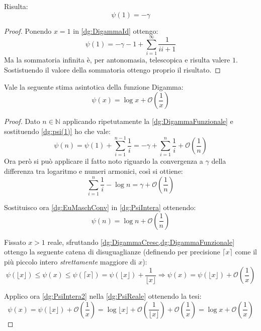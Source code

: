\begin{corollary}\label{dg:psi(1)}
	Risulta:
	\begin{equation*}
		\psi(1)=-\gamma
	\end{equation*}
\end{corollary}
\begin{proof}
	Ponendo $x=1$ in \cref{dg:DigammaId} ottengo:
	\begin{equation*}
		\psi(1)=-\gamma-1+\sum_{i=1}^{\infty}\frac 1{i{i+1}}
	\end{equation*}
	Ma la sommatoria infinita è, per antonomasia, telescopica e risulta valere $1$. Sostistuendo il valore della sommatoria
	ottengo proprio il risultato.
\end{proof}

\begin{theorem}\label{dg:psiApprox}
	Vale la seguente stima asintotica della funzione Digamma:
	\begin{equation*}
		\psi(x)=\log{x}+\mathcal{O}\left(\frac 1x\right)
	\end{equation*}
\end{theorem}
\begin{proof}
	Dato $n\in\mathbb{N}$ applicando ripetutamente la \cref{dg:DigammaFunzionale} e sostituendo \cref{dg:psi(1)}
	ho che vale:
	\begin{equation}\label{dg:PsiIntera}
		\psi(n)=\psi(1)+\sum_{i=1}^{n-1}\frac 1i = -\gamma+\sum_{i=1}^{n}\frac 1i + \mathcal{O}(\frac 1n)
	\end{equation}
	Ora però si può applicare il fatto noto riguardo la convergenza a $\gamma$ della differenza tra logaritmo e numeri armonici, 
	così si ottiene:
	\begin{equation}\label{dg:EuMaschConv}
		\sum_{i=1}^{n}\frac 1i - \log n = \gamma +\mathcal{O}\left(\frac 1n\right)
	\end{equation}
	
	Sostituisco ora \cref{dg:EuMaschConv} in \cref{dg:PsiIntera} ottenendo:
	\begin{equation}\label{dg:PsiIntera2}
		\psi(n)=\log n +\mathcal{O}\left(\frac 1n\right)
	\end{equation}

	Fissato $x>1$ reale, sfruttando \cref{dg:DigammaCresc,dg:DigammaFunzionale} ottengo la seguente catena di
	disuguaglianze (definendo per precisione $\lceil x\rceil$ come il più piccolo intero \emph{strettamente} maggiore di $x$):
	\begin{equation}\label{dg:PsiReale}
		\psi(\lfloor x\rfloor)\le \psi(x) \le \psi(\lceil x\rceil)=\psi(\lfloor x\rfloor)+\frac 1{\lfloor x\rfloor} \Rightarrow
		\psi(x)=\psi(\lfloor x\rfloor)+\mathcal{O}\left(\frac 1x\right)
	\end{equation}

	Applico ora \cref{dg:PsiIntera2} nella \cref{dg:PsiReale} ottenendo la tesi:
	\begin{equation*}
		\psi(x)=\psi(\lfloor x\rfloor)+\mathcal{O}\left(\frac 1x\right)=
		\log{\lfloor x\rfloor }+\mathcal{O}\left(\frac 1{\lfloor x\rfloor}\right)+\mathcal{O}\left(\frac 1x\right)=
		\log{x}+\mathcal{O}\left(\frac 1x\right)
	\end{equation*}
\end{proof}










